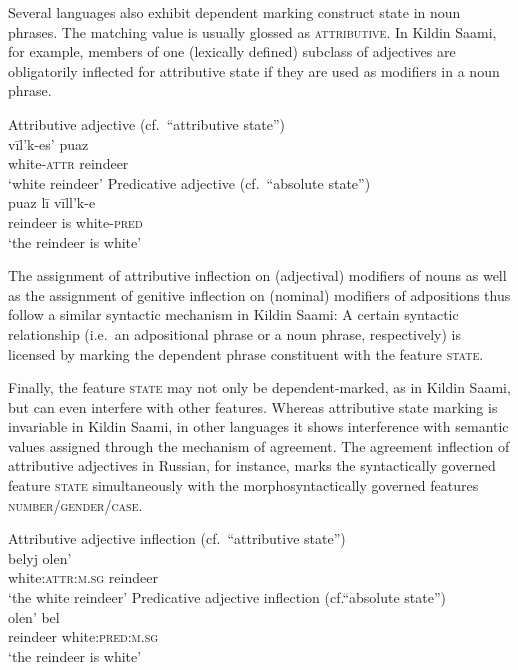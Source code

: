 Several languages also exhibit dependent marking construct state in noun phrases. The matching value is usually glossed as \textsc{attributive}. In Kildin Saami, for example, members of one (lexically defined) subclass of adjectives are obligatorily inflected for attributive state if they are used as modifiers in a noun phrase.
\begin{exe}
\ex\label{state np kildin}
\begin{xlist}
\ex	
{\rm Attributive adjective (cf.~“attributive state”)}\\
\gll 	vīl'k-es'		puaz\\
	white-\textsc{attr}	reindeer\\
\glt 	‘white reindeer’
\ex	
{\rm Predicative adjective (cf.~“absolute state”)}\\
\gll	puaz lī vīll'k-e\\
	reindeer is white-\textsc{pred}\\
\glt	‘the reindeer is white’
\end{xlist}
\end{exe}
The assignment of attributive inflection on (adjectival) modifiers of nouns as well as the assignment of genitive inflection on (nominal) modifiers of adpositions thus follow a similar syntactic mechanism in Kildin Saami: A certain syntactic relationship (i.e.~an adpositional phrase or a noun phrase, respectively) is licensed by marking the dependent phrase constituent with the feature \textsc{state}.

Finally, the feature \textsc{state} may not only be dependent-marked, as in Kildin Saami, but can even interfere with other features. Whereas attributive state marking is invariable in Kildin Saami, in other languages it shows interference with semantic values assigned through the mechanism of agreement. The agreement inflection of attributive adjectives in Russian, for instance, marks the syntactically governed feature \textsc{state} simultaneously with the morphosyntactically governed features \textsc{number/gender/case}.
\begin{exe}
\ex\label{state np russian}
\begin{xlist}
\ex 
{\rm Attributive adjective inflection (cf.~“attributive state”)}\\
\gll 	belyj	olen'\\
	white:\textsc{attr:m.sg}	reindeer\\
\glt 	‘the white reindeer’
\ex	
{\rm Predicative adjective inflection (cf.“absolute state”)}\\
\gll	olen' bel\\
	reindeer white:\textsc{pred:m.sg}\\
\glt	‘the reindeer is white’
\end{xlist}
\end{exe}

